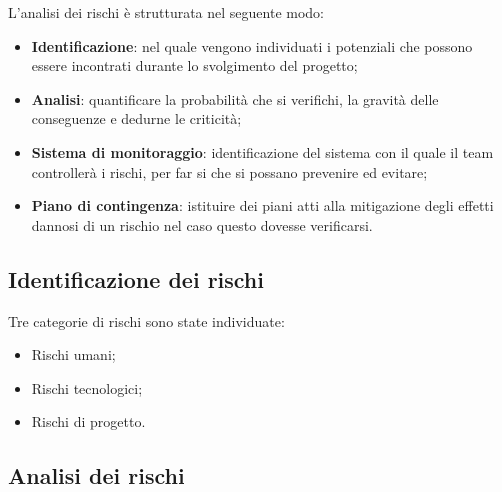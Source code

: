 L'analisi dei rischi è strutturata nel seguente modo:
\begin{itemize}
	\item \textbf{Identificazione}: nel quale vengono individuati i potenziali  che possono essere incontrati durante lo svolgimento del progetto;
	\item \textbf{Analisi}: quantificare la probabilità che si verifichi,
	la gravità delle conseguenze e dedurne le criticità;
	\item \textbf{Sistema di monitoraggio}: identificazione del sistema con il quale il team controllerà i rischi, per far si che si possano prevenire ed evitare;
	\item \textbf{Piano di contingenza}: istituire dei piani atti alla mitigazione degli effetti dannosi di un rischio nel caso questo dovesse verificarsi.
\end{itemize}
\subsection{Identificazione dei rischi}
	Tre categorie di rischi sono state individuate:
	\begin{itemize}
		\item Rischi umani;
		\item Rischi tecnologici;
		\item Rischi di progetto.
	\end{itemize}
\subsection{Analisi dei rischi}
